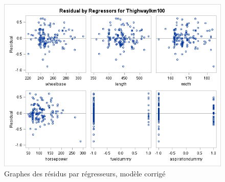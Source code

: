 \documentclass[11pt,a4paper]{article}
\begin{document}
\begin{figure}
	\centering
	\includegraphics[width=1\linewidth]{resbyregressorscorr}
	\caption{Graphes des résidus par régresseurs, modèle corrigé}
	\label{fig:regressorscorr}
\end{figure}
\end{document}
